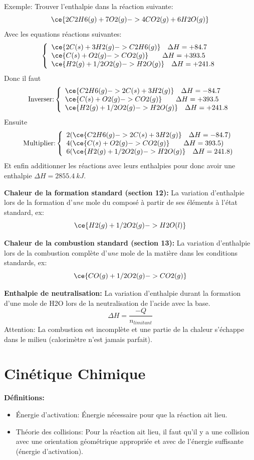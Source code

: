 \documentclass[french, a4paper, 12pt]{article}
\begin{document}
Exemple: Trouver l'enthalpie dans la réaction suivante:
\[
\ce{2C2H6(g) + 7 O2(g) -> 4CO2(g) + 6H2O(g)}
\]
Avec les equations réactions suivantes:
\[
\left\{
	\begin{array}{ll}
		\ce{2C(s) + 3H2(g) -> C2H6(g)}\quad \Delta H=+84.7\\
		\ce{C(s) + O2(g) -> CO2(g)}\qquad \Delta H=+393.5\\
		\ce{H2(g) + 1/2O2 (g) -> H2O(g)} \quad \Delta H=+241.8
	\end{array}
\right.
\]
Donc il faut
\[
\text{Inverser:}\left\{
	\begin{array}{ll}
		\ce{C2H6(g) -> 2C(s) + 3H2(g)}\quad \Delta H=-84.7\\
		\ce{C(s) + O2(g) -> CO2(g)}\qquad \Delta H=+393.5\\
		\ce{H2(g) + 1/2O2 (g) -> H2O(g)} \quad \Delta H=+241.8
	\end{array}
\right.
\]
Ensuite
\[
\text{Multiplier:}\left\{
	\begin{array}{ll}
		2(\ce{C2H6(g) -> 2C(s) + 3H2(g)}\quad \Delta H=-84.7)\\
		4(\ce{C(s) + O2(g) -> CO2(g)}\qquad \Delta H=393.5)\\
		6(\ce{H2(g) + 1/2O2 (g) -> H2O(g)} \quad \Delta H=241.8)
	\end{array}
\right.
\]
Et enfin additionner les réactions avec leurs enthalpies pour donc avoir une enthalpie $\Delta H=\SI{2855.4}{kJ}$.

\vspace{0.5em}
\textbf{Chaleur de la formation standard (section 12):}
La variation d'enthalpie lors de la formation d'\emph{une} mole du composé à partir de ses éléments à l'état standard, ex:
\[
\ce{H2(g) + 1/2O2(g) -> H2O(l)}
\]

\vspace{0.5em}
\textbf{Chaleur de la combustion standard (section 13):}
La variation d'enthalpie lors de la combustion complète d'\emph{une} mole de la matière dans les conditions standards, ex:
\[
\ce{CO(g) + 1/2O2(g) -> CO2 (g)}
\]

\vspace{0.5em}
\textbf{Enthalpie de neutralisation:}
La variation d'enthalpie durant la formation d'une mole de H2O lors de la neutralisation de l'acide avec la base.
\[
\Delta H=\frac{-Q}{n_{limitant}}
\]
Attention: La combustion est incomplète et une partie de la chaleur s'échappe dans le milieu (calorimètre n'est jamais parfait).
\pagebreak

\section{Cinétique Chimique}
\textbf{Définitions:}
\begin{itemize}
\item Énergie d'activation: Énergie nécessaire pour que la réaction ait lieu.
\item Théorie des collisions: Pour la réaction ait lieu, il faut qu'il y a une collision avec une orientation géométrique appropriée et avec de l'énergie suffisante (énergie d'activation). 
\end{itemize}
\end{document}
